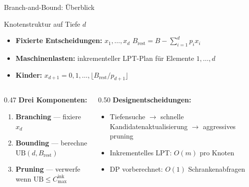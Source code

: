 \documentclass[fleqn,11pt,aspectratio=43]{beamer}
\newcommand{\Cinc}{C_{\max}^{\mathrm{ink}}}
\newcommand{\Brem}{B_{\mathrm{rest}}}
\newcommand{\UB}{\mathrm{UB}}
\begin{document}
\begin{frame}[shrink=8]{Branch-and-Bound: Überblick}
  \begin{block}{Knotenstruktur auf Tiefe $d$}
    \begin{itemize}
      \item \textbf{Fixierte Entscheidungen:} $x_1,\ldots,x_d$\quad
            $\Brem = B - \sum_{i=1}^{d}p_ix_i$
      \item \textbf{Maschinenlasten:} inkrementeller LPT-Plan für Elemente $1,\ldots,d$
      \item \textbf{Kinder:} $x_{d+1}=0,1,\ldots,\lfloor\Brem/p_{d+1}\rfloor$
    \end{itemize}
  \end{block}
  \begin{columns}[T]
    \begin{column}{0.47\textwidth}
      \textbf{Drei Komponenten:}
      \begin{enumerate}
        \item \textbf{Branching} — fixiere $x_{d}$
        \item \textbf{Bounding} — berechne $\UB(d,\Brem)$
        \item \textbf{Pruning} — verwerfe wenn $\UB\leq\Cinc$
      \end{enumerate}
    \end{column}
    \begin{column}{0.50\textwidth}
      \textbf{Designentscheidungen:}
      \begin{itemize}
        \item Tiefensuche $\to$ schnelle Kandidatenaktualisierung $\to$ aggressives pruning
        \item Inkrementelles LPT: $O(m)$ pro Knoten
        \item DP vorberechnet: $O(1)$ Schrankenabfragen
      \end{itemize}
    \end{column}
  \end{columns}
\end{frame}
\end{document}
